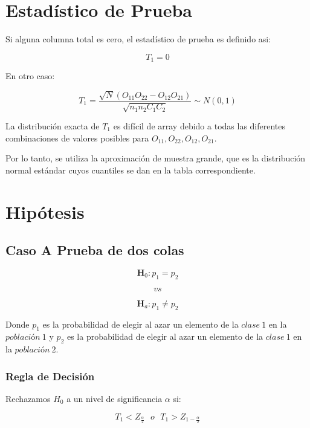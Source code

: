\documentclass[
  a4paper,
  oneside,
  openany]{book}
\begin{document}
\hypertarget{estaduxedstico-de-prueba-9}{%
\section{Estadístico de Prueba}\label{estaduxedstico-de-prueba-9}}

Si alguna columna total es cero, el estadístico de prueba es definido asi:

\[T_{1}=0\]

En otro caso:

\[T_{1}=\frac{\sqrt{N}(O_{11}O_{22}-O_{12}O_{21})}{\sqrt{n_{1}n_{2}C_{1}C_{2}}}\sim N(0,1)\]

La distribución exacta de \(T_1\) es difícil de array debido a todas las diferentes combinaciones de valores posibles para \(O_{11},O_{22},O_{12},O_{21}\).

Por lo tanto, se utiliza la aproximación de muestra grande, que es la distribución normal estándar cuyos cuantiles se dan en la tabla correspondiente.

\hypertarget{hipuxf3tesis-9}{%
\section{Hipótesis}\label{hipuxf3tesis-9}}

\hypertarget{caso-a-prueba-de-dos-colas-7}{%
\subsection*{Caso A Prueba de dos colas}\label{caso-a-prueba-de-dos-colas-7}}


\[\textbf{H}_0: p_{1} = p_{2}\]

\[vs\]

\[\textbf{H}_a: p_{1} \neq p_{2}\]

Donde \(p_{1}\) es la probabilidad de elegir al azar un elemento de la \(clase\ 1\) en la \(población\ 1\) y \(p_{2}\) es la probabilidad de elegir al azar un elemento de la \(clase\ 1\) en la \(población\ 2\).

\hypertarget{regla-de-decisiuxf3n-21}{%
\subsubsection*{Regla de Decisión}\label{regla-de-decisiuxf3n-21}}


Rechazamos \(H_0\) a un nivel de significancia \(\alpha\) si:

\[T_{1}< Z_\frac{\alpha}{2} \ \ \    o  \ \ \  T_{1} > Z_{1-\frac{\alpha}{2}}\]
\end{document}
